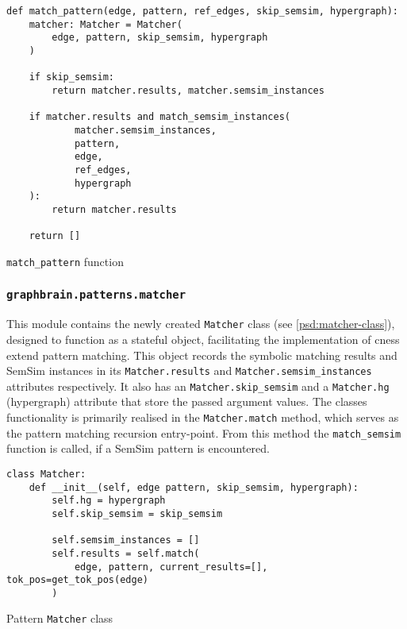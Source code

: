 \documentclass[11pt]{scrreprt}
\begin{document}
\begin{pseudo}
\begin{lstlisting}
def match_pattern(edge, pattern, ref_edges, skip_semsim, hypergraph):
    matcher: Matcher = Matcher(
        edge, pattern, skip_semsim, hypergraph
    )

    if skip_semsim:
        return matcher.results, matcher.semsim_instances

    if matcher.results and match_semsim_instances(
            matcher.semsim_instances,
            pattern,
            edge,
            ref_edges,
            hypergraph
    ):
        return matcher.results

    return []
\end{lstlisting}
\caption{\texttt{match\_pattern} function}
\label{psd:match-pattern-function}
\end{pseudo}



\subsubsection{\texttt{graphbrain.patterns.matcher}}
\label{sec:graphbrain.patterns.matcher}
This module contains the newly created \texttt{Matcher} class (see \cref{psd:matcher-class}), designed to function as a stateful object, facilitating the implementation of \gls{cness} extend pattern matching. This object records the symbolic matching results and SemSim instances in its \texttt{Matcher.results} and \texttt{Matcher.semsim\_instances} attributes respectively. It also has an \texttt{Matcher.skip\_semsim} and a \texttt{Matcher.hg} (hypergraph) attribute that store the passed argument values. The classes functionality is primarily realised in the \texttt{Matcher.match} method, which serves as the pattern matching recursion entry-point. From this method the \texttt{match\_semsim} function is called, if a SemSim pattern is encountered.


\begin{pseudo}
\begin{lstlisting}
class Matcher:
    def __init__(self, edge pattern, skip_semsim, hypergraph):
        self.hg = hypergraph
        self.skip_semsim = skip_semsim

        self.semsim_instances = []
        self.results = self.match(
            edge, pattern, current_results=[], tok_pos=get_tok_pos(edge)
        )
\end{lstlisting}
\caption{Pattern \texttt{Matcher} class}
\label{psd:matcher-class}
\end{pseudo}
\end{document}
